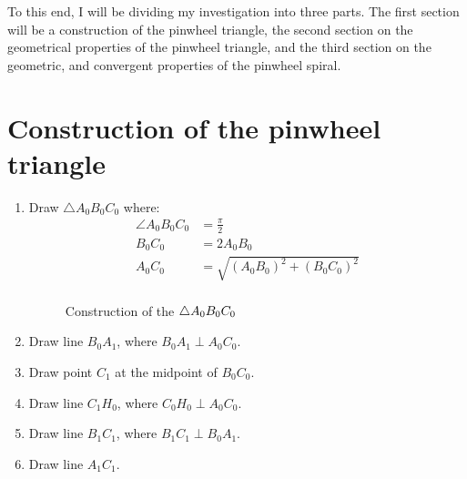 To this end, I will be dividing my investigation into three parts. The first section will be a construction of the pinwheel triangle, the second section on the geometrical properties of the pinwheel triangle, and the third section on the geometric, and convergent properties of the pinwheel spiral.

\newpage
\section{Construction of the pinwheel triangle}
\begin{enumerate}
    \item Draw $\triangle A_{0}B_{0}C_{0}$ where:
    \begin{equation}
        \begin{aligned}
            \angle A_{0}B_{0}C_{0} &= \frac{\pi}{2} \\
            B_{0}C_{0} &= 2A_{0}B_{0} \\
            A_{0}C_{0} &= \sqrt{(A_{0}B_{0})^2 + (B_{0}C_{0})^2} \\
        \end{aligned}
    \end{equation}
    \begin{figure}[H]
        \centering
        \label{right-triangle}
        \caption{Construction of the $\protect\triangle A_{0}B_{0}C_{0}$}
    \end{figure}

    \item Draw line $B_{0}A_{1}$, where $B_{0}A_{1} \perp A_{0}C_{0}$.
    \item Draw point $C_{1}$ at the midpoint of $B_{0}C_{0}$.
    \item Draw line $C_{1}H_{0}$, where $C_{0}H_{0} \perp A_{0}C_{0}$.
    \item Draw line $B_{1}C_{1}$, where $B_{1}C_{1} \perp B_{0}A_{1}$.
    \item Draw line $A_{1}C_{1}$.
\end{enumerate}

